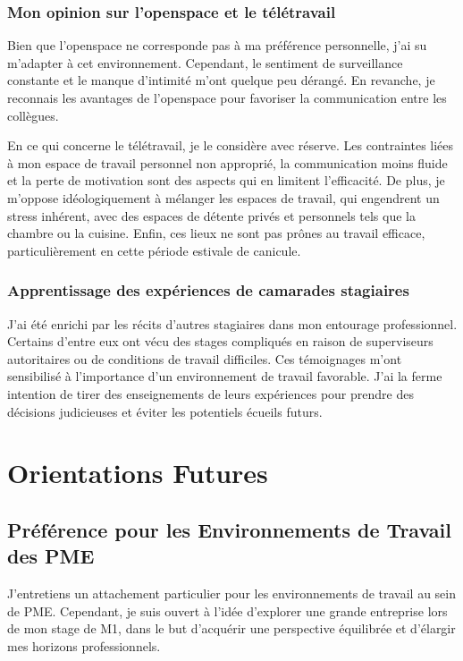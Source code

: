 \subsubsection{Mon opinion sur l'openspace et le télétravail}
Bien que l'openspace ne corresponde pas à ma préférence personnelle, j'ai su m'adapter à cet environnement.
Cependant, le sentiment de surveillance constante et le manque d'intimité m'ont quelque peu dérangé.
En revanche, je reconnais les avantages de l'openspace pour favoriser la communication entre les collègues.

En ce qui concerne le télétravail, je le considère avec réserve.
Les contraintes liées à mon espace de travail personnel non approprié, la communication moins fluide et la perte de motivation sont des aspects qui en limitent l'efficacité.
De plus, je m'oppose idéologiquement à mélanger les espaces de travail, qui engendrent un stress inhérent, avec des espaces de détente privés et personnels tels que la chambre ou la cuisine.
Enfin, ces lieux ne sont pas prônes au travail efficace, particulièrement en cette période estivale de canicule.

\subsubsection{Apprentissage des expériences de camarades stagiaires}
J'ai été enrichi par les récits d'autres stagiaires dans mon entourage professionnel.
Certains d'entre eux ont vécu des stages compliqués en raison de superviseurs autoritaires ou de conditions de travail difficiles.
Ces témoignages m'ont sensibilisé à l'importance d'un environnement de travail favorable.
J'ai la ferme intention de tirer des enseignements de leurs expériences pour prendre des décisions judicieuses et éviter les potentiels écueils futurs.

\section{Orientations Futures}
\subsection{Préférence pour les Environnements de Travail des PME}
J'entretiens un attachement particulier pour les environnements de travail au sein de PME.
Cependant, je suis ouvert à l'idée d'explorer une grande entreprise lors de mon stage de M1, dans le but d'acquérir une perspective équilibrée et d'élargir mes horizons professionnels.

